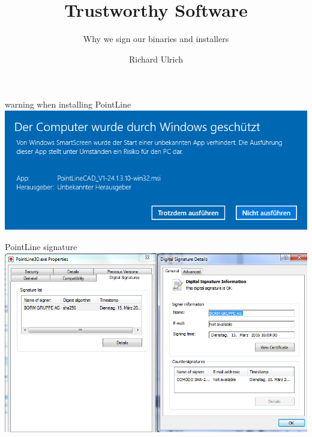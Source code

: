 \documentclass[11pt]{beamer}
\author{Richard Ulrich}
\title{Trustworthy Software}
\subtitle{Why we sign our binaries and installers}
\institute{BORM Informatik AG}
\begin{document}
\begin{frame}
\titlepage
\end{frame}


\begin{frame}{warning when installing PointLine}
\includegraphics[scale=0.5]{obsolete_signature.png}
\end{frame}

\begin{frame}{PointLine signature}
\includegraphics[scale=0.38]{pointLine_signature.png}
\end{frame}
\end{document}
